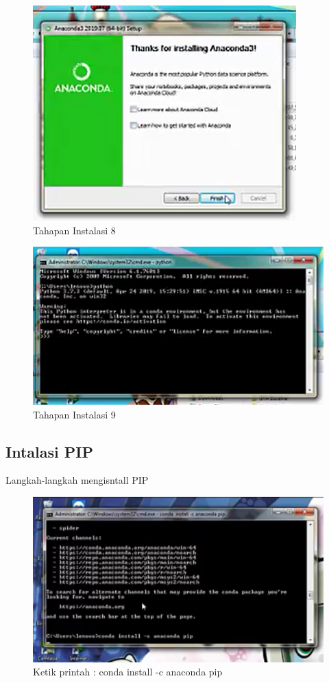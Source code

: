 	\begin{figure}
	\includegraphics[scale=0.5]{section/8.png}
	\centering
	\caption{Tahapan Instalasi 8}
	\end{figure}

	\begin{figure}
	\includegraphics[scale=0.5]{section/9.png}
	\centering
	\caption{Tahapan Instalasi 9}
	\end{figure}

\subsection{Intalasi PIP}
Langkah-langkah mengisntall PIP

	\begin{figure}
	\includegraphics[scale=0.5]{section/pip1}
	\centering
	\caption{Ketik printah : conda install -c anaconda pip}
	\end{figure}
	
